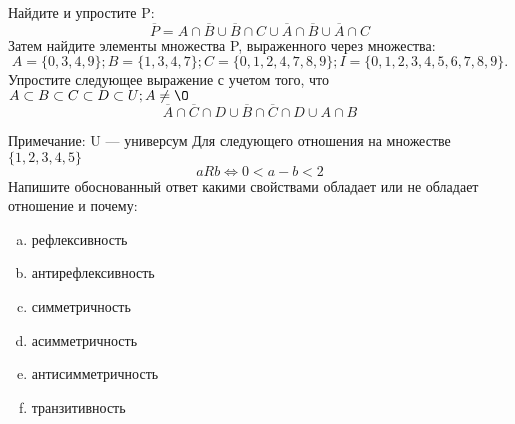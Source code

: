 \documentclass[10pt]{exam}
\begin{document}
\begin{questions}
\question
Найдите и упростите P:
\begin{equation*}
\overline{P} = A \cap \overline{B} \cup \overline{B} \cap C \cup \overline{A} \cap \overline{B} \cup \overline{A} \cap C
\end{equation*}
Затем найдите элементы множества P, выраженного через множества:
\begin{equation*}
A = \{0, 3, 4, 9\}; 
B = \{1, 3, 4, 7\};
C = \{0, 1, 2, 4, 7, 8, 9\};
I = \{0, 1, 2, 3, 4, 5, 6, 7, 8, 9\}.
\end{equation*}\question
Упростите следующее выражение с учетом того, что $A\subset B \subset C \subset D \subset U; A \neq \O$
\begin{equation*}
\overline{A} \cap \overline{C} \cap D \cup \overline{B} \cap \overline{C} \cap D \cup A \cap B
\end{equation*}

Примечание: U — универсум\question
Для следующего отношения на множестве $\{1, 2, 3, 4, 5\}$ 
\begin{equation*}
aRb \iff 0 < a-b<2
\end{equation*}
Напишите обоснованный ответ какими свойствами обладает или не обладает отношение и почему:   
\begin{enumerate} [a)]\setcounter{enumi}{0}
\item рефлексивность
\item антирефлексивность
\item симметричность
\item асимметричность
\item антисимметричность
\item транзитивность
\end{enumerate}


\end{questions}
\end{document}
